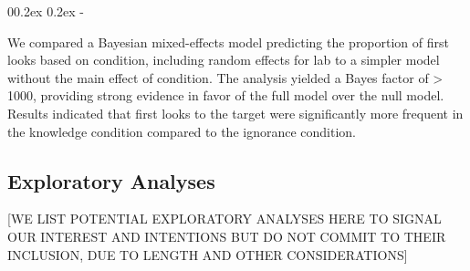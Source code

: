 \documentclass[
  english,
  man,floatsintext]{apa6}
\makeatletter
\let\oldsubparagraph\subparagraph
\renewcommand{\subparagraph}[1]{\oldsubparagraph{#1}\mbox{}}
\renewcommand{\subparagraph}[1]{\@startsection{subparagraph}{5}{1em}%
  {0\baselineskip \@plus 0.2ex \@minus 0.2ex}%
  {-\z@\relax}%
  {\normalfont\normalsize\itshape\hspace{\parindent}{#1}\textit{\addperi}}{\relax}}
\makeatother
\begin{document}
\hypertarget{adults-3}{%
\subparagraph{Adults}\label{adults-3}}

We compared a Bayesian mixed-effects model predicting the proportion of first looks based on condition, including random effects for lab to a simpler model without the main effect of condition. The analysis yielded a Bayes factor of \textgreater{} 1000, providing strong evidence in favor of the full model over the null model. Results indicated that first looks to the target were significantly more frequent in the knowledge condition compared to the ignorance condition.

\hypertarget{exploratory-analyses}{%
\subsection{Exploratory Analyses}\label{exploratory-analyses}}

{[}WE LIST POTENTIAL EXPLORATORY ANALYSES HERE TO SIGNAL OUR INTEREST AND INTENTIONS BUT DO NOT COMMIT TO THEIR INCLUSION, DUE TO LENGTH AND OTHER CONSIDERATIONS{]}
\end{document}
